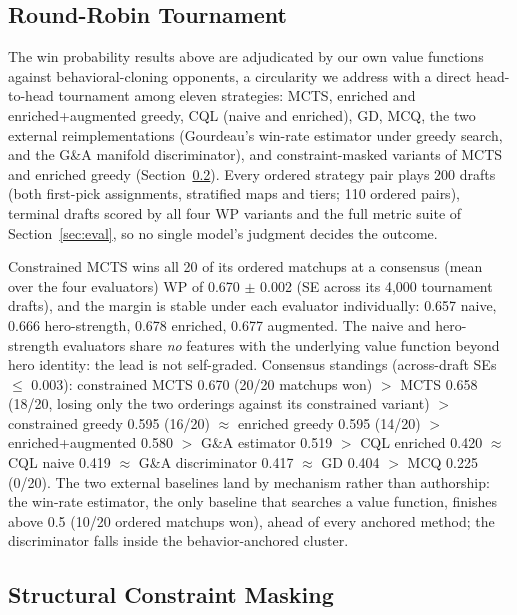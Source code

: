 \documentclass[journal]{IEEEtran}
\begin{document}
\subsection{Round-Robin Tournament}
\label{sec:tournament}

The win probability results above are adjudicated by our own value functions against behavioral-cloning opponents, a circularity we address with a direct head-to-head tournament among eleven strategies: MCTS, enriched and enriched+augmented greedy, CQL (naive and enriched), GD, MCQ, the two external reimplementations (Gourdeau's win-rate estimator under greedy search, and the G\&A manifold discriminator), and constraint-masked variants of MCTS and enriched greedy (Section~\ref{sec:constrained}). Every ordered strategy pair plays 200 drafts (both first-pick assignments, stratified maps and tiers; 110 ordered pairs), terminal drafts scored by all four WP variants and the full metric suite of Section~\ref{sec:eval}, so no single model's judgment decides the outcome.

Constrained MCTS wins all 20 of its ordered matchups at a consensus (mean over the four evaluators) WP of 0.670 $\pm$ 0.002 (SE across its 4{,}000 tournament drafts), and the margin is stable under each evaluator individually: 0.657 naive, 0.666 hero-strength, 0.678 enriched, 0.677 augmented. The naive and hero-strength evaluators share \textit{no} features with the underlying value function beyond hero identity: the lead is not self-graded. Consensus standings (across-draft SEs $\leq$ 0.003): constrained MCTS 0.670 (20/20 matchups won) $>$ MCTS 0.658 (18/20, losing only the two orderings against its constrained variant) $>$ constrained greedy 0.595 (16/20) $\approx$ enriched greedy 0.595 (14/20) $>$ enriched+augmented 0.580 $>$ G\&A estimator 0.519 $>$ CQL enriched 0.420 $\approx$ CQL naive 0.419 $\approx$ G\&A discriminator 0.417 $\approx$ GD 0.404 $>$ MCQ 0.225 (0/20). The two external baselines land by mechanism rather than authorship: the win-rate estimator, the only baseline that searches a value function, finishes above 0.5 (10/20 ordered matchups won), ahead of every anchored method; the discriminator falls inside the behavior-anchored cluster.

\subsection{Structural Constraint Masking}
\label{sec:constrained}
\end{document}
